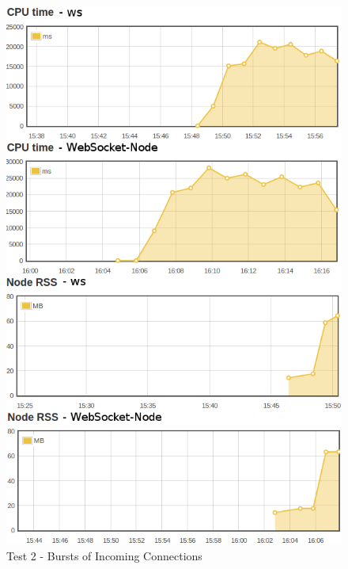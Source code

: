 \documentclass[conference]{IEEEtran}
\begin{document}
\begin{frame}{}
  \begin{figure}
    \centering
	\includegraphics[width=1\linewidth]{img/test2v2.png}
    \caption{Test 2 - Bursts of Incoming Connections}
  \end{figure}
\end{frame}
\\
\end{document}
